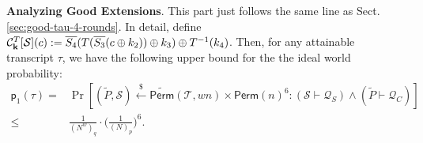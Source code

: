 %




\arrangespace

\noindent \textbf{Analyzing Good Extensions}.
%
This part just follows the same line as Sect. \ref{sec:good-tau-4-rounds}. In detail, define $\mathcal{C}_{\mathbf{k}}^T[\mathcal{S}](c):=   \overline{S_4}(T(\overline{S_3}(c\oplus k_2))\oplus k_3)\oplus T^{-1}(k_4)$. Then, for any attainable transcript $\tau$, we have the following upper bound for the the ideal world probability:
%
%
\begin{align*}
\mathsf{p}_{1}(\tau)=&\operatorname{Pr}\left[(\widetilde{P},\mathcal{S})\stackrel{\$}{\leftarrow} \widetilde{{\mathsf{Perm}}}(\mathcal{T}, w n)\times\mathsf{Perm}(n)^6: (\mathcal{S} \vdash \mathcal{Q}_{S}) \wedge(\widetilde{P} \vdash \mathcal{Q}_{C})  \right]		\\
\leq&\frac{1}{(N^w)_q}\cdot\bigg(\frac{1}{(N)_p}\bigg)^6.
\end{align*}



